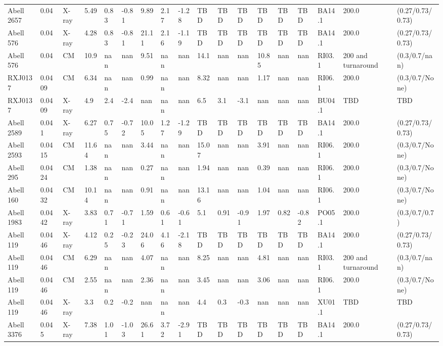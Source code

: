 \documentclass{article}
\begin{document}
\begin{center}
\begin{landscape}
\begin{longtable}{llllllllllllllllll}
Abell 2657 & 0.04 & X-ray & 5.49 & 0.83 & -0.81 & 9.89 & 2.17 & -1.28 & TBD & TBD & TBD & TBD & TBD & TBD & BA14.1 & 200.0 & (0.27/0.73/0.73) \\
Abell 576 & 0.04 & X-ray & 4.28 & 0.83 & -0.81 & 21.11 & 2.16 & -1.19 & TBD & TBD & TBD & TBD & TBD & TBD & BA14.1 & 200.0 & (0.27/0.73/0.73) \\
Abell 576 & 0.04 & CM & 10.9 & nan & nan & 9.51 & nan & nan & 14.1 & nan & nan & 10.85 & nan & nan & RI03.1 & 200 and turnaround & (0.3/0.7/nan) \\
RXJ0137 & 0.0409 & CM & 6.34 & nan & nan & 0.99 & nan & nan & 8.32 & nan & nan & 1.17 & nan & nan & RI06.1 & 200.0 & (0.3/0.7/None) \\
RXJ0137 & 0.0409 & X-ray & 4.9 & 2.4 & -2.4 & nan & nan & nan & 6.5 & 3.1 & -3.1 & nan & nan & nan & BU04.1 & TBD & TBD \\
Abell 2589 & 0.041 & X-ray & 6.27 & 0.75 & -0.72 & 10.05 & 1.27 & -1.29 & TBD & TBD & TBD & TBD & TBD & TBD & BA14.1 & 200.0 & (0.27/0.73/0.73) \\
Abell 2593 & 0.0415 & CM & 11.64 & nan & nan & 3.44 & nan & nan & 15.07 & nan & nan & 3.91 & nan & nan & RI06.1 & 200.0 & (0.3/0.7/None) \\
Abell 295 & 0.0424 & CM & 1.38 & nan & nan & 0.27 & nan & nan & 1.94 & nan & nan & 0.39 & nan & nan & RI06.1 & 200.0 & (0.3/0.7/None) \\
Abell 160 & 0.0432 & CM & 10.14 & nan & nan & 0.91 & nan & nan & 13.16 & nan & nan & 1.04 & nan & nan & RI06.1 & 200.0 & (0.3/0.7/None) \\
Abell 1983 & 0.0442 & X-ray & 3.83 & 0.71 & -0.71 & 1.59 & 0.61 & -0.61 & 5.1 & 0.91 & -0.91 & 1.97 & 0.82 & -0.82 & PO05.1 & 200.0 & (0.3/0.7/0.7) \\
Abell 119 & 0.0446 & X-ray & 4.12 & 0.25 & -0.23 & 24.06 & 4.16 & -2.18 & TBD & TBD & TBD & TBD & TBD & TBD & BA14.1 & 200.0 & (0.27/0.73/0.73) \\
Abell 119 & 0.0446 & CM & 6.29 & nan & nan & 4.07 & nan & nan & 8.25 & nan & nan & 4.81 & nan & nan & RI03.1 & 200 and turnaround & (0.3/0.7/nan) \\
Abell 119 & 0.0446 & CM & 2.55 & nan & nan & 2.36 & nan & nan & 3.45 & nan & nan & 3.06 & nan & nan & RI06.1 & 200.0 & (0.3/0.7/None) \\
Abell 119 & 0.0446 & X-ray & 3.3 & 0.2 & -0.2 & nan & nan & nan & 4.4 & 0.3 & -0.3 & nan & nan & nan & XU01.1 & TBD & TBD \\
Abell 3376 & 0.045 & X-ray & 7.38 & 1.01 & -1.03 & 26.61 & 3.72 & -2.91 & TBD & TBD & TBD & TBD & TBD & TBD & BA14.1 & 200.0 & (0.27/0.73/0.73) \\

\end{longtable}
\end{landscape}
\end{center}
\end{document}
